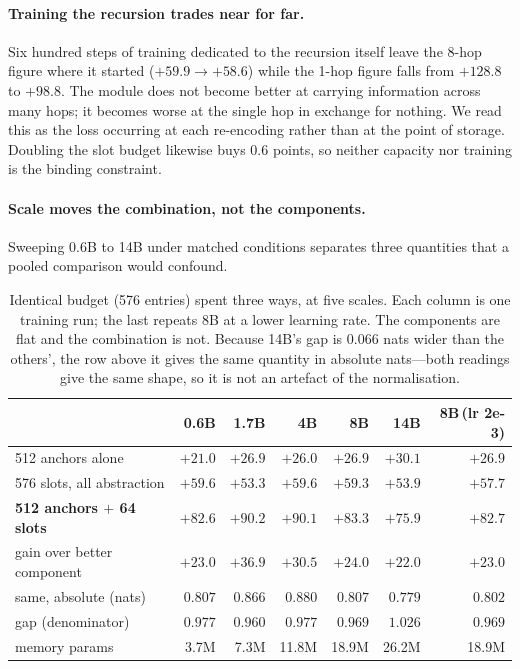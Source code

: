 \documentclass[11pt]{article}
\begin{document}
\paragraph{Training the recursion trades near for far.}
Six hundred steps of training dedicated to the recursion itself leave the 8-hop
figure where it started ($+59.9 \to +58.6$) while the 1-hop figure falls from
$+128.8$ to $+98.8$. The module does not become better at carrying information
across many hops; it becomes worse at the single hop in exchange for nothing. We
read this as the loss occurring at each re-encoding rather than at the point of
storage. Doubling the slot budget likewise buys $0.6$ points, so neither
capacity nor training is the binding constraint.

\paragraph{Scale moves the combination, not the components.}
\label{para:scale}
Sweeping 0.6B to 14B under matched conditions separates three quantities that a
pooled comparison would confound.

\begin{table}[ht]
\centering
\small
\begin{tabular}{lrrrrrr}
\toprule
 & 0.6B & 1.7B & 4B & 8B & 14B & 8B\,(lr 2e-3) \\
\midrule
512 anchors alone            & $+21.0$ & $+26.9$ & $+26.0$ & $+26.9$ & $+30.1$ & $+26.9$ \\
576 slots, all abstraction   & $+59.6$ & $+53.3$ & $+59.6$ & $+59.3$ & $+53.9$ & $+57.7$ \\
\midrule
\textbf{512 anchors $+$ 64 slots} & $+82.6$ & $\mathbf{+90.2}$
  & $\mathbf{+90.1}$ & $+83.3$ & $+75.9$ & $+82.7$ \\
\quad gain over better component & $+23.0$ & $+36.9$ & $+30.5$ & $+24.0$ & $+22.0$ & $+23.0$ \\
\midrule
\quad same, absolute (nats)  & $0.807$ & $0.866$ & $\mathbf{0.880}$ & $0.807$ & $0.779$ & $0.802$ \\
\quad gap (denominator)      & $0.977$ & $0.960$ & $0.977$ & $0.969$ & $1.026$ & $0.969$ \\
\quad memory params          & 3.7M & 7.3M & 11.8M & 18.9M & 26.2M & 18.9M \\
\bottomrule
\end{tabular}
\caption{Identical budget (576 entries) spent three ways, at five scales. Each
column is one training run; the last repeats 8B at a lower learning rate. The
components are flat and the combination is not. Because 14B's gap is $0.066$
nats wider than the others', the row above it gives the same quantity in
absolute nats---both readings give the same shape, so it is not an artefact of
the normalisation.}
\label{tab:scale}
\end{table}
\end{document}
